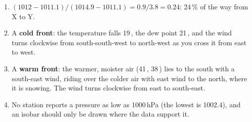 \begin{answerbox}
\begin{enumerate}[label=\textbf{\thechapter.\arabic*},leftmargin=*,itemsep=3pt]
\item $(1012-1011.1)/(1014.9-1011.1)=0.9/3.8=0.24$: 24\,\% of the way from X to Y.
\item A \textbf{cold front}: the temperature falls 19\,\degF, the dew point 21\,\degF, and the wind turns clockwise from south-south-west to north-west as you cross it from east to west.
\item A \textbf{warm front}: the warmer, moister air (41\,\degF, 38\,\degF) lies to the south with a south-east wind, riding over the colder air with east wind to the north, where it is snowing. The wind turns clockwise from east to south-east.
\item No station reports a pressure as low as 1000\,hPa (the lowest is 1002.4), and an isobar should only be drawn where the data support it.
\end{enumerate}
\end{answerbox}

